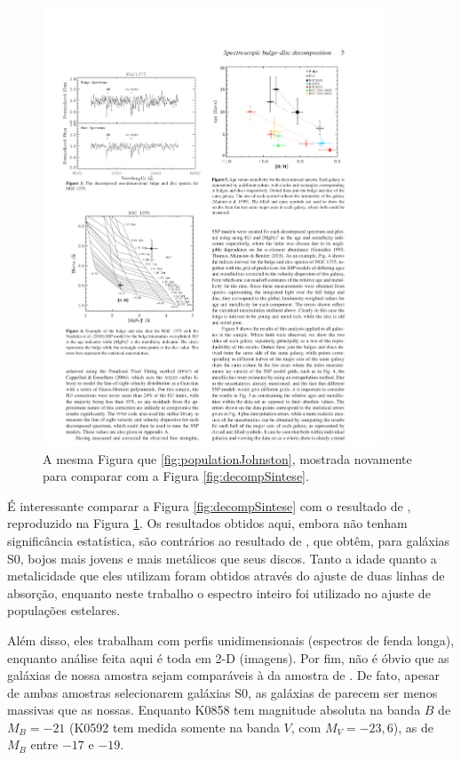 \begin{figure}
	\includegraphics[width=0.9\textwidth]{figuras/johnston-pop}
	\caption[A mesma Figura que \ref{fig:populationJohnston}] {A mesma Figura que
	\ref{fig:populationJohnston}, mostrada novamente para comparar com a Figura
	\ref{fig:decompSintese}.}
	\label{fig:populationJohnston2}
\end{figure}

É interessante comparar a Figura \ref{fig:decompSintese} com o resultado de
\citet{Johnston2012}, reproduzido na Figura \ref{fig:populationJohnston2}.
Os resultados obtidos aqui, embora não tenham significância estatística, são
contrários ao resultado de \citeauthor{Johnston2012}, que obtêm, para galáxias
S0, bojos mais jovens e mais metálicos que seus discos. Tanto a idade quanto a
metalicidade que eles utilizam foram obtidos através do ajuste de duas linhas de
absorção, enquanto neste trabalho o espectro inteiro foi utilizado no ajuste de
populações estelares.

Além disso, eles trabalham com perfis unidimensionais (espectros de fenda
longa), enquanto análise feita aqui é toda em 2-D (imagens). Por fim, não é
óbvio que as galáxias de nossa amostra sejam comparáveis à da amostra de
\citeauthor{Johnston2012}. De fato, apesar de ambas amostras selecionarem
galáxias S0, as galáxias de \citeauthor{Johnston2012} parecem ser menos massivas
que as nossas. Enquanto K0858 tem magnitude absoluta na banda $B$ de $M_B = -21$
(K0592 tem medida somente na banda $V$, com $M_V = -23,6$), as de
\citeauthor{Johnston2012} $M_B$ entre $-17$ e $-19$.

